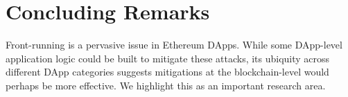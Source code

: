 


\section{Concluding Remarks}

Front-running is a pervasive issue in Ethereum DApps. While some DApp-level application logic could be built to mitigate these attacks, its ubiquity across different DApp categories suggests mitigations at the blockchain-level would perhaps be more effective. We highlight this as an important research area. 



